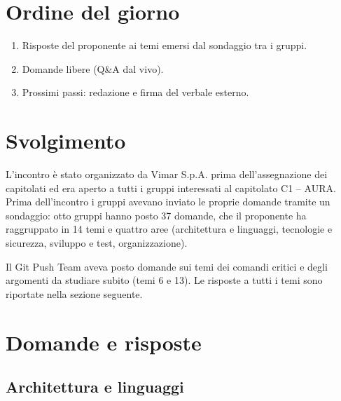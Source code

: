 


\section{Ordine del giorno}
\begin{enumerate}
  \item Risposte del proponente ai temi emersi dal sondaggio tra i gruppi.
  \item Domande libere (Q\&A dal vivo).
  \item Prossimi passi: redazione e firma del verbale esterno.
\end{enumerate}

\section{Svolgimento}
L'incontro è stato organizzato da Vimar S.p.A. prima dell'assegnazione
dei capitolati ed era aperto a tutti i gruppi interessati al capitolato
C1 -- AURA. Prima dell'incontro i gruppi avevano inviato le proprie
domande tramite un sondaggio: otto gruppi hanno posto 37 domande, che il
proponente ha raggruppato in 14 temi e quattro aree (architettura e
linguaggi, tecnologie e sicurezza, sviluppo e test, organizzazione).

Il Git Push Team aveva posto domande sui temi dei comandi critici e
degli argomenti da studiare subito (temi 6 e 13). Le risposte a tutti i
temi sono riportate nella sezione seguente.

\section{Domande e risposte}

\subsection{Architettura e linguaggi}



